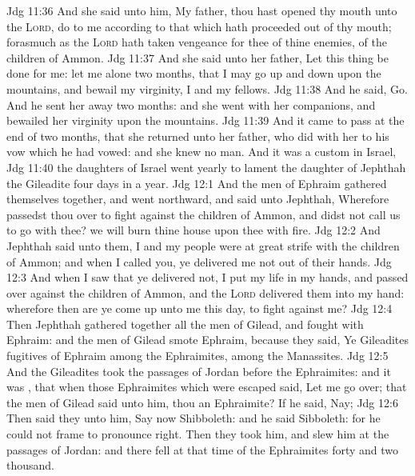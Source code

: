 \vs Jdg 11:36 And she said unto him, My father,  thou hast opened thy mouth unto the \textsc{Lord}, do to me according to that which hath proceeded out of thy mouth; forasmuch as the \textsc{Lord} hath taken vengeance for thee of thine enemies,  of the children of Ammon.
\vs Jdg 11:37 And she said unto her father, Let this thing be done for me: let me alone two months, that I may go up and down upon the mountains, and bewail my virginity, I and my fellows.
\vs Jdg 11:38 And he said, Go. And he sent her away  two months: and she went with her companions, and bewailed her virginity upon the mountains.
\vs Jdg 11:39 And it came to pass at the end of two months, that she returned unto her father, who did with her  to his vow which he had vowed: and she knew no man. And it was a custom in Israel,
\vs Jdg 11:40  the daughters of Israel went yearly to lament the daughter of Jephthah the Gileadite four days in a year.
\vs Jdg 12:1 And the men of Ephraim gathered themselves together, and went northward, and said unto Jephthah, Wherefore passedst thou over to fight against the children of Ammon, and didst not call us to go with thee? we will burn thine house upon thee with fire.
\vs Jdg 12:2 And Jephthah said unto them, I and my people were at great strife with the children of Ammon; and when I called you, ye delivered me not out of their hands.
\vs Jdg 12:3 And when I saw that ye delivered  not, I put my life in my hands, and passed over against the children of Ammon, and the \textsc{Lord} delivered them into my hand: wherefore then are ye come up unto me this day, to fight against me?
\vs Jdg 12:4 Then Jephthah gathered together all the men of Gilead, and fought with Ephraim: and the men of Gilead smote Ephraim, because they said, Ye Gileadites  fugitives of Ephraim among the Ephraimites,  among the Manassites.
\vs Jdg 12:5 And the Gileadites took the passages of Jordan before the Ephraimites: and it was , that when those Ephraimites which were escaped said, Let me go over; that the men of Gilead said unto him,  thou an Ephraimite? If he said, Nay;
\vs Jdg 12:6 Then said they unto him, Say now Shibboleth: and he said Sibboleth: for he could not frame to pronounce  right. Then they took him, and slew him at the passages of Jordan: and there fell at that time of the Ephraimites forty and two thousand.
